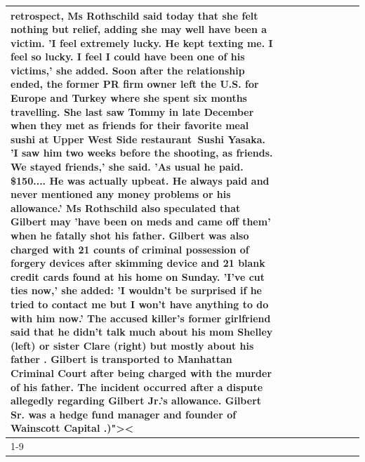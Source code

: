 \begin{table}[H]
\begin{tabular}{lllrlllll}
retrospect, Ms Rothschild said today that she felt nothing but relief, adding she may well have been a victim. 'I feel extremely lucky. He kept texting me. I feel so lucky. I feel I could have been one of his victims,' she added. Soon after the relationship ended, the former PR firm owner left the U.S. for Europe and Turkey where she spent six months  travelling. She last saw Tommy in late December when they met as friends for their favorite meal sushi at Upper West Side restaurant Sushi Yasaka. 'I saw him two weeks before the shooting, as friends. We stayed friends,' she said. 'As usual he paid. \$150.... He was actually upbeat. He always paid and never mentioned any money problems or his allowance.' Ms Rothschild also speculated that Gilbert may 'have been on meds and came off them' when he fatally shot his father. Gilbert was also charged with 21 counts of criminal possession of forgery devices after skimming device and 21 blank credit cards found at his home on Sunday. 'I've cut ties now,' she added: 'I wouldn’t be surprised if he tried to contact me but I won’t have anything to do with him now.' The accused killer's former girlfriend said that he didn't talk much about his mom Shelley (left) or sister Clare (right) but mostly about his father . Gilbert is transported to Manhattan Criminal Court  after being charged with the murder of his father. The incident occurred after a dispute allegedly regarding Gilbert Jr.'s allowance. Gilbert Sr. was a hedge fund manager and founder of Wainscott Capital .)">< \\
\cline{1-9} \cline{2-9}

\end{tabular}
\end{table}
